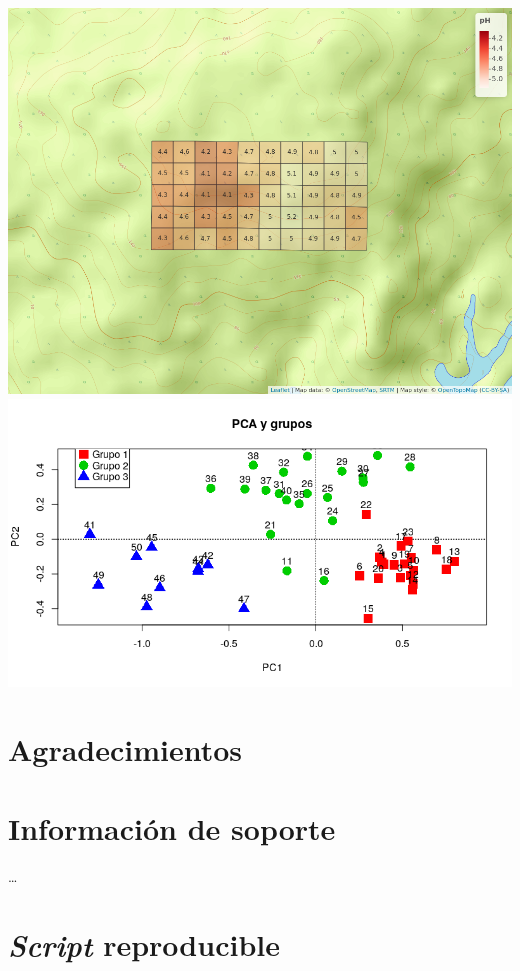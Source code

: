 \documentclass[11pt,]{article}
\begin{document}
\includegraphics{mapa_cuadros_ph.png}
\includegraphics{grafico_pca_suelo.png}

\section{Agradecimientos}\label{agradecimientos}

\section{Información de soporte}\label{informaciuxf3n-de-soporte}

\ldots

\section{\texorpdfstring{\emph{Script}
reproducible}{Script reproducible}}\label{script-reproducible}
\end{document}

